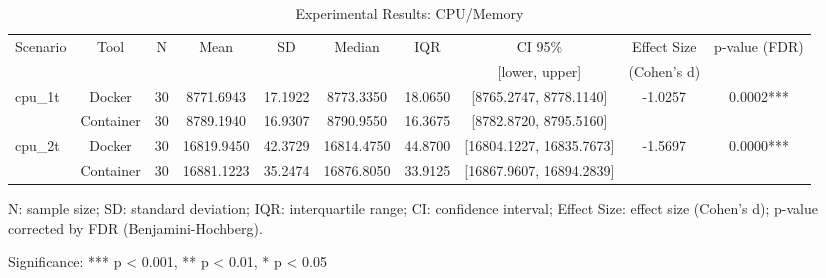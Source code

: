 \documentclass{article}
\begin{document}

\begin{table}[h]
\centering
\small
\caption{Experimental Results: CPU/Memory}
\label{tab:cpu_memory}
\begin{tabular}{lccccccccc}
\toprule
Scenario & Tool & N & Mean & SD & Median & IQR & CI 95\% & Effect Size & p-value (FDR) \\
 & & & & & & & [lower, upper] & (Cohen's d) & \\
\midrule
\multirow{2}{*}{cpu\_1t} & Docker & 30 & 8771.6943 & 17.1922 & 8773.3350 & 18.0650 & [8765.2747, 8778.1140] & -1.0257 & 0.0002*** \\
 & Container & 30 & 8789.1940 & 16.9307 & 8790.9550 & 16.3675 & [8782.8720, 8795.5160] &  &  \\
\midrule
\multirow{2}{*}{cpu\_2t} & Docker & 30 & 16819.9450 & 42.3729 & 16814.4750 & 44.8700 & [16804.1227, 16835.7673] & -1.5697 & 0.0000*** \\
 & Container & 30 & 16881.1223 & 35.2474 & 16876.8050 & 33.9125 & [16867.9607, 16894.2839] &  &  \\
\midrule
\bottomrule
\end{tabular}
\begin{tablenotes}
\small
\item N: sample size; SD: standard deviation; IQR: interquartile range; CI: confidence interval; Effect Size: effect size (Cohen's d); p-value corrected by FDR (Benjamini-Hochberg).
\item Significance: *** p < 0.001, ** p < 0.01, * p < 0.05
\end{tablenotes}
\end{table}
\end{document}
